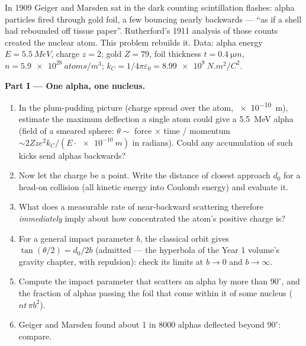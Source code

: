 \begin{problem}\label{pb:b3:scattering-theory:1}
In 1909 Geiger and Marsden sat in the dark counting scintillation
flashes: alpha particles fired through gold foil, a few bouncing
nearly backwards --- ``as if a shell had rebounded off tissue
paper''. Rutherford's 1911 analysis of those counts created the
nuclear atom. This problem rebuilds it. Data: alpha energy $E =
\qty{5.5}{MeV}$, charge $z = 2$; gold $Z = 79$, foil thickness $t
= \qty{0.4}{\micro m}$, $n = \qty{5.9e28}{atoms/m^3}$; $k_C =
1/4\pi\varepsilon_0 = \qty{8.99e9}{N.m^2/C^2}$.

\medskip\noindent\textbf{Part I --- One alpha, one nucleus.}
\begin{enumerate}
  \item In the plum-pudding picture (charge spread over the atom,
        \qty{e-10}{m}), estimate the maximum deflection a single
        atom could give a \qty{5.5}{MeV} alpha (field of a smeared
        sphere: $\theta \sim$ force $\times$ time / momentum
        $\sim 2Zze^2k_C/(E\cdot\qty{e-10}{m})$ in radians). Could
        any accumulation of such kicks send alphas backwards?
  \item Now let the charge be a point. Write the distance of
        closest approach $d_0$ for a head-on collision (all
        kinetic energy into Coulomb energy) and evaluate it.
  \item What does a measurable rate of near-backward scattering
        therefore \emph{immediately} imply about how concentrated
        the atom's positive charge is?
  \item For a general impact parameter $b$, the classical orbit
        gives $\tan(\theta/2) = d_0/2b$ (admitted --- the
        hyperbola of the Year 1 volume's gravity chapter, with
        repulsion): check its limits at $b \to 0$ and $b \to
        \infty$.
  \item Compute the impact parameter that scatters an alpha by
        more than $90^\circ$, and the fraction of alphas passing
        the foil that come within it of some nucleus ($n t\,\pi
        b^2$).
  \item Geiger and Marsden found about 1 in 8000 alphas deflected
        beyond $90^\circ$: compare.
\end{enumerate}


\end{problem}
